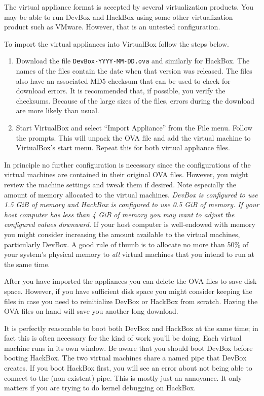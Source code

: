\documentclass{article}
\begin{document}
The virtual appliance format is accepted by several virtualization products. You may be able to
run DevBox and HackBox using some other virtualization product such as VMware. However, that is
an untested configuration.

To import the virtual appliances into VirtualBox follow the steps below.

\begin{enumerate}

\item Download the file \texttt{DevBox-YYYY-MM-DD.ova} and similarly for HackBox. The names of
  the files contain the date when that version was released. The files also have an associated
  MD5 checksum that can be used to check for download errors. It is recommended that, if
  possible, you verify the checksums. Because of the large sizes of the files, errors during the
  download are more likely than usual.

\item Start VirtualBox and select ``Import Appliance'' from the File menu. Follow the prompts.
  This will unpack the OVA file and add the virtual machine to VirtualBox's start menu. Repeat
  this for both virtual appliance files.

\end{enumerate}

In principle no further configuration is necessary since the configurations of the virtual
machines are contained in their original OVA files. However, you might review the machine
settings and tweak them if desired. Note especially the amount of memory allocated to the
virtual machines. \emph{DevBox is configured to use 1.5 GiB of memory and HackBox is configured
to use 0.5 GiB of memory. If your host computer has less than 4 GiB of memory you may want to
adjust the configured values downward.} If your host computer is well-endowed with memory you
might consider increasing the amount available to the virtual machines, particularly DevBox. A
good rule of thumb is to allocate no more than 50\% of your system's physical memory to
\emph{all} virtual machines that you intend to run at the same time.

After you have imported the appliances you can delete the OVA files to save disk space. However,
if you have sufficient disk space you might consider keeping the files in case you need to
reinitialize DevBox or HackBox from scratch. Having the OVA files on hand will save you another
long download.

It is perfectly reasonable to boot both DevBox and HackBox at the same time; in fact this is
often necessary for the kind of work you'll be doing. Each virtual machine runs in its own
window. Be aware that you should boot DevBox before booting HackBox. The two virtual machines
share a named pipe that DevBox creates. If you boot HackBox first, you will see an error about
not being able to connect to the (non-existent) pipe. This is mostly just an annoyance. It only
matters if you are trying to do kernel debugging on HackBox.
\end{document}

